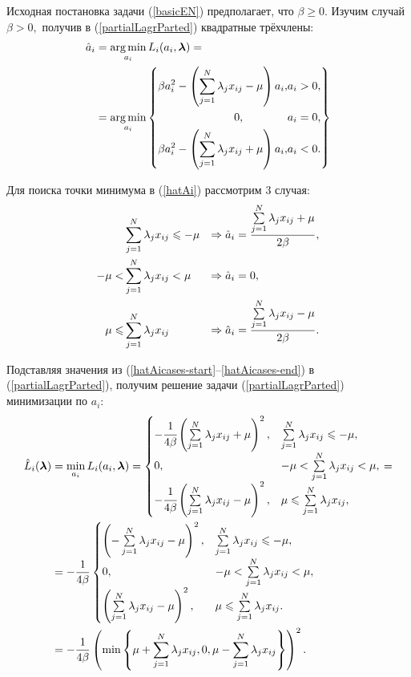 Исходная постановка задачи (\ref{basicEN}) предполагает, что $\beta\ge0.$ Изучим случай $\beta > 0,$ получив в (\ref{partialLagrParted}) квадратные трёхчлены:
\begin{equation}
	\label{hatAi}
	\begin{split}
		\hat a_i &= \mathop{\mbox{arg\ \!min}}\limits_{a_i} L_i(a_i,\boldsymbol{\mathbf{\lambda}}) = \\
				 &=	\mathop{\mbox{arg\ \!min}}\limits_{a_i} \left\{
				 	\begin{aligned}
						\beta a_i^2 - \left(\sum\limits_{j=1}^N\lambda_jx_{ij}-\mu\right)a_i, &a_i > 0,\\
						0, \qquad\qquad &a_i = 0,\\
						\beta a_i^2 - \left(\sum\limits_{j=1}^N\lambda_jx_{ij}+\mu\right)a_i, &a_i < 0.\\
					\end{aligned}	
					\right\}
	\end{split}
\end{equation}

Для поиска точки минимума в (\ref{hatAi}) рассмотрим 3 случая:
\begin{align}
	\label{hatAicases-start}
	         &\sum\limits_{j=1}^N\lambda_jx_{ij} \leqslant -\mu 	&\Rightarrow \hat a_i &= \frac{\sum\limits_{j=1}^N\lambda_jx_{ij}+\mu}{2\beta}, \\
	-\mu <   &\sum\limits_{j=1}^N\lambda_jx_{ij} < \mu 	&\Rightarrow \hat a_i &= 0, \\
	\label{hatAicases-end}
	\mu \leqslant &\sum\limits_{j=1}^N\lambda_jx_{ij} 			&\Rightarrow \hat a_i &= \frac{\sum\limits_{j=1}^N\lambda_jx_{ij}-\mu}{2\beta}.
\end{align}


Подставляя значения из (\ref{hatAicases-start}--\ref{hatAicases-end}) в (\ref{partialLagrParted}), получим решение задачи (\ref{partialLagrParted}) минимизации по $a_i$:
\begin{align}
	\label{hatLiSquared}
	\begin{split}
		\hat L_i(\boldsymbol{\mathbf{\lambda}}) &= \mathop{\mbox{min}}\limits_{a_i}L_i(a_i, \boldsymbol{\mathbf{\lambda}}) =
		\begin{cases}
			-\cfrac1{4\beta}\left(\sum\limits_{j=1}^N\lambda_jx_{ij}+\mu\right)^2, &\sum\limits_{j=1}^N\lambda_jx_{ij} \leqslant -\mu,\\
			0, 										&-\mu < \sum\limits_{j=1}^N\lambda_jx_{ij} < \mu,\\
			-\cfrac1{4\beta}\left(\sum\limits_{j=1}^N\lambda_jx_{ij}-\mu\right)^2, &\mu\leqslant\sum\limits_{j=1}^N\lambda_jx_{ij},
		\end{cases} = \\
		&= -\frac1{4\beta}
		\begin{cases}
			\left(-\sum\limits_{j=1}^N\lambda_jx_{ij}-\mu\right)^2, &\sum\limits_{j=1}^N\lambda_jx_{ij} \leqslant -\mu,\\
			0, 	 					&-\mu < \sum\limits_{j=1}^N\lambda_jx_{ij} < \mu,\\
			\left(\sum\limits_{j=1}^N\lambda_jx_{ij}-\mu\right)^2, &\mu\leqslant\sum\limits_{j=1}^N\lambda_jx_{ij}.
		\end{cases} 	\\
		&= -\frac1{4\beta} \left(\mathop{\mbox{min}}\limits\left\{\mu + \sum\limits_{j=1}^N\lambda_jx_{ij}, 0, \mu-\sum\limits_{j=1}^N\lambda_jx_{ij}\right\}\right)^2.
	\end{split}
\end{align}

